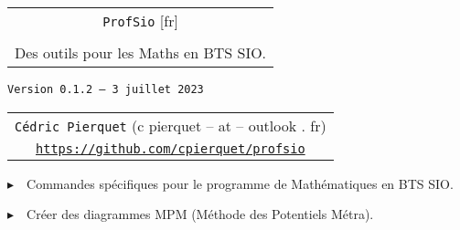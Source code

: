 \documentclass[french,a4paper,11pt]{article}
\def\TPversion{0.1.2}
\def\TPdate{3 juillet 2023}
\begin{document}
\setlength{\aweboxleftmargin}{0.07\linewidth}
\setlength{\aweboxcontentwidth}{0.93\linewidth}
\setlength{\aweboxvskip}{8pt}

\pagestyle{fancy}

\thispagestyle{empty}

\vspace{2cm}

\begin{center}
	\begin{minipage}{0.75\linewidth}
	\begin{tcolorbox}[colframe=yellow,colback=yellow!15]
		\begin{center}
			\begin{tabular}{c}
				{\Huge \texttt{ProfSio} [fr]}\\
				\\
				{\LARGE Des outils pour les Maths en BTS SIO.} \\
			\end{tabular}
			
			\bigskip
			
			{\small \texttt{Version \TPversion{} -- \TPdate}}
		\end{center}
	\end{tcolorbox}
\end{minipage}
\end{center}

\begin{center}
	\begin{tabular}{c}
	\texttt{Cédric Pierquet} ({\ttfamily c pierquet -- at -- outlook . fr})\\
	\texttt{\url{https://github.com/cpierquet/profsio}}
\end{tabular}
\end{center}

\vspace{0.15cm}

{$\blacktriangleright$~~Commandes spécifiques pour le programme de Mathématiques en BTS SIO\footnotemark{}.}

\vspace{0.15cm}

{$\blacktriangleright$~~Créer des diagrammes MPM\footnotemark{} (Méthode des Potentiels Métra).}
\end{document}
